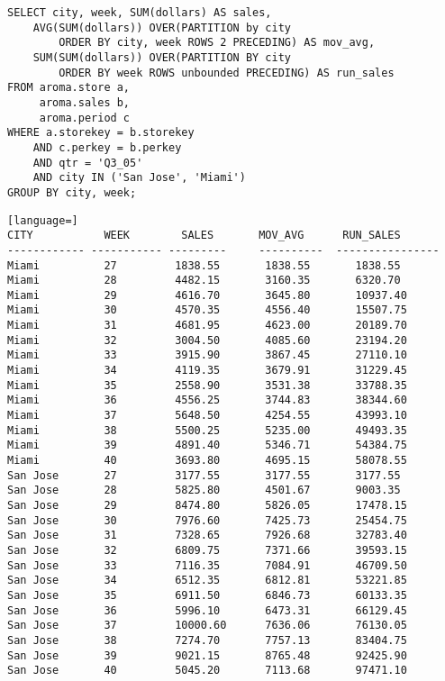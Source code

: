 \begin{lstlisting}
SELECT city, week, SUM(dollars) AS sales,
    AVG(SUM(dollars)) OVER(PARTITION by city 
        ORDER BY city, week ROWS 2 PRECEDING) AS mov_avg,
    SUM(SUM(dollars)) OVER(PARTITION BY city
        ORDER BY week ROWS unbounded PRECEDING) AS run_sales
FROM aroma.store a,
     aroma.sales b,
     aroma.period c
WHERE a.storekey = b.storekey
    AND c.perkey = b.perkey
    AND qtr = 'Q3_05'
    AND city IN ('San Jose', 'Miami')
GROUP BY city, week;
\end{lstlisting}

\begin{lstlisting}[language=]
CITY           WEEK        SALES       MOV_AVG      RUN_SALES                        
------------ ----------- ---------     ----------  ----------------
Miami          27         1838.55       1838.55       1838.55
Miami          28         4482.15       3160.35       6320.70
Miami          29         4616.70       3645.80       10937.40
Miami          30         4570.35       4556.40       15507.75
Miami          31         4681.95       4623.00       20189.70
Miami          32         3004.50       4085.60       23194.20
Miami          33         3915.90       3867.45       27110.10
Miami          34         4119.35       3679.91       31229.45
Miami          35         2558.90       3531.38       33788.35
Miami          36         4556.25       3744.83       38344.60
Miami          37         5648.50       4254.55       43993.10
Miami          38         5500.25       5235.00       49493.35
Miami          39         4891.40       5346.71       54384.75
Miami          40         3693.80       4695.15       58078.55
San Jose       27         3177.55       3177.55       3177.55
San Jose       28         5825.80       4501.67       9003.35
San Jose       29         8474.80       5826.05       17478.15
San Jose       30         7976.60       7425.73       25454.75
San Jose       31         7328.65       7926.68       32783.40
San Jose       32         6809.75       7371.66       39593.15
San Jose       33         7116.35       7084.91       46709.50
San Jose       34         6512.35       6812.81       53221.85
San Jose       35         6911.50       6846.73       60133.35
San Jose       36         5996.10       6473.31       66129.45
San Jose       37         10000.60      7636.06       76130.05
San Jose       38         7274.70       7757.13       83404.75
San Jose       39         9021.15       8765.48       92425.90
San Jose       40         5045.20       7113.68       97471.10
\end{lstlisting}

